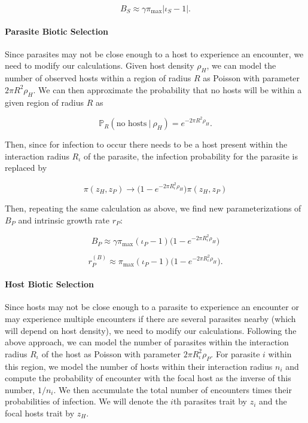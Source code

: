 \documentclass[
]{article}
\begin{document}
\[B_S\approx\gamma\pi_{\max}|\iota_S-1|.\]

\hypertarget{parasite-biotic-selection}{%
\paragraph{Parasite Biotic Selection}\label{parasite-biotic-selection}}

Since parasites may not be close enough to a host to experience an
encounter, we need to modify our calculations. Given host density
\(\rho_H\), we can model the number of observed hosts within a region of
radius \(R\) as Poisson with parameter \(2\pi R^2\rho_H\). We can then
approximate the probability that no hosts will be within a given region
of radius \(R\) as

\[\mathbb P_R(\text{no hosts} \ | \ \rho_H)=e^{-2\pi R^2\rho_H}.\]

Then, since for infection to occur there needs to be a host present
within the interaction radius \(R_\iota\) of the parasite, the infection
probability for the parasite is replaced by

\[\pi(z_H,z_P)\to\big(1-e^{-2\pi R_\iota^2\rho_H}\big)\pi(z_H,z_P)\]

Then, repeating the same calculation as above, we find new
parameterizations of \(B_P\) and intrinsic growth rate \(r_P\):

\[B_P\approx\gamma\pi_{\max}(\iota_P-1)\big(1-e^{-2\pi R_\iota^2\rho_H}\big)\]

\[r_P^{(B)}\approx\pi_{\max}(\iota_P-1)\big(1-e^{-2\pi R_\iota^2\rho_H}\big).\]

\hypertarget{host-biotic-selection}{%
\paragraph{Host Biotic Selection}\label{host-biotic-selection}}

Since hosts may not be close enough to a parasite to experience an
encounter or may experience multiple encounters if there are several
parasites nearby (which will depend on host density), we need to modify
our calculations. Following the above approach, we can model the number
of parasites within the interaction radius \(R_\iota\) of the host as
Poisson with parameter \(2\pi R_\iota^2\rho_P\). For parasite \(i\)
within this region, we model the number of hosts within their
interaction radius \(n_i\) and compute the probability of encounter with
the focal host as the inverse of this number, \(1/n_i\). We then
accumulate the total number of encounters times their probabilities of
infection. We will denote the \(i\)th parasites trait by \(z_i\) and the
focal hosts trait by \(z_H\).
\end{document}
